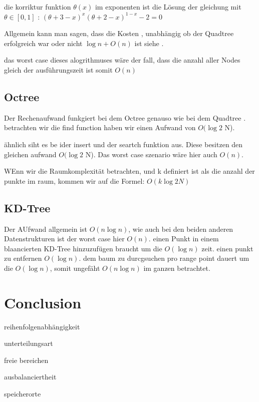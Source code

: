 \documentclass[11pt]{article}
\newcommand{\qt}{Quadtree }
\newcommand{\oc}{Octree }
\newcommand{\kd}{KD-Tree }
\begin{document}
die korriktur funktion $\theta(x)$ im exponenten ist die Lösung der gleichung mit $\theta \in [0,1]$ : 
$(\theta + 3 -x)^x(\theta + 2 - x)^{1-x} -2 = 0$

Allgemein kann man sagen, dass die Kosten , unabhängig ob der \qt erfolgreich war oder nicht $\log n + O(n)$ ist siehe \cite[S.475ff]{quadtree} .


das worst case dieses alogrithmuses wäre der fall, dass die anzahl aller Nodes gleich der ausführungszeit ist somit $O(n)$

\subsection{\oc}

Der Rechenaufwand funkgiert bei dem \oc genauso wie bei dem \qt . 
betrachten wir die find function haben wir einen Aufwand von $O(\log2 $ N). 

ähnlich siht es be ider insert und der seartch funktion aus. Diese besitzen den gleichen aufwand  $O(\log2 $ N).
Das worst case szenario wäre hier auch $O(n)$. 

WEnn wir die Raumkomplexität betrachten, und k definiert ist als die anzahl der punkte im raum, kommen wir auf die Formel: $O(k \log2 N) $ 


\subsection{\kd}

Der AUfwand allgemein ist $O(n \log n)$, wie auch bei den beiden anderen Datenstrukturen ist der worst case hier $O(n)$. 
einen Punkt in einem blaancierten \kd hinzuzufügen braucht um die $O(\log n)$ zeit. einen punkt zu entfernen $O(\log n)$. 
dem baum zu durcgsuchen pro range point dauert um die $O(\log n)$, somit ungefäht $O(n \log n)$ im ganzen betrachtet. 

\pagebreak

\section{Conclusion}
reihenfolgenabhängigkeit 

unterteilungsart

freie bereichen

ausbalanciertheit 

speicherorte 

\pagebreak


\end{document}
